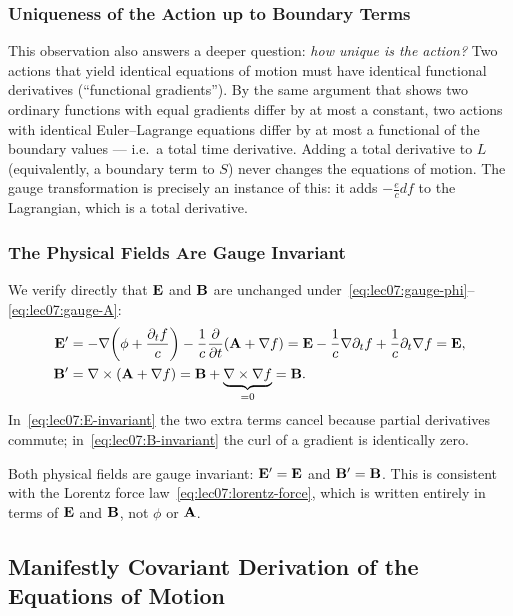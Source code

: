 \subsubsection*{Uniqueness of the Action up to Boundary Terms}

This observation also answers a deeper question: \emph{how unique is the action?}
Two actions that yield identical equations of motion must have identical
functional derivatives (``functional gradients'').  By the same argument that
shows two ordinary functions with equal gradients differ by at most a constant,
two actions with identical Euler--Lagrange equations differ by at most a
functional of the boundary values — i.e.\ a total time derivative.  Adding a
total derivative to $L$ (equivalently, a boundary term to $S$) never changes
the equations of motion.  The gauge transformation is precisely an instance of
this: it adds $-\tfrac{e}{c}df$ to the Lagrangian, which is a total derivative.

\subsubsection*{The Physical Fields Are Gauge Invariant}

We verify directly that $\mathbf{E}$ and $\mathbf{B}$ are unchanged under~\eqref{eq:lec07:gauge-phi}--\eqref{eq:lec07:gauge-A}:
\begin{align}
    \mathbf{E}' &= -\nabla\!\left(\phi + \frac{\partial_t f}{c}\right)
             - \frac{1}{c}\frac{\partial}{\partial t}\!\left(\mathbf{A} + \nabla f\right)
           = \mathbf{E}
             - \frac{1}{c}\nabla\partial_t f
             + \frac{1}{c}\partial_t\nabla f = \mathbf{E} ,
    \label{eq:lec07:E-invariant}\\
    \mathbf{B}' &= \nabla\times(\mathbf{A} + \nabla f)
           = \mathbf{B} + \underbrace{\nabla\times\nabla f}_{= 0} = \mathbf{B} .
    \label{eq:lec07:B-invariant}
\end{align}
In~\eqref{eq:lec07:E-invariant} the two extra terms cancel because partial
derivatives commute; in~\eqref{eq:lec07:B-invariant} the curl of a gradient is
identically zero.

Both physical fields are gauge invariant: $\mathbf{E}' = \mathbf{E}$ and $\mathbf{B}' = \mathbf{B}$.  This
is consistent with the Lorentz force law~\eqref{eq:lec07:lorentz-force}, which
is written entirely in terms of $\mathbf{E}$ and $\mathbf{B}$, not $\phi$ or $\mathbf{A}$.

\subsection{Manifestly Covariant Derivation of the Equations of Motion}\label{sec:lec07:covariant}

